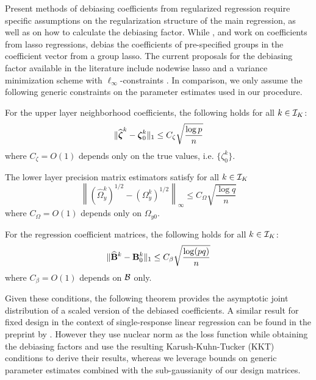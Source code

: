 Present methods of debiasing coefficients from regularized regression require specific assumptions on the regularization structure of the main regression, as well as on how to calculate the debiasing factor. While \cite{ZhangZhang14}, \cite{JavanmardMontanari14} and \cite{vanDeGeerEtal14} work on coefficients from lasso regressions, \cite{MitraZhang16} debias the coefficients of pre-specified groups in the coefficient vector from a group lasso. The current proposals for the debiasing factor available in the literature include nodewise lasso \citep{ZhangZhang14} and a variance minimization scheme with $\ell_\infty$-constraints \citep{JavanmardMontanari14}. In comparison, we only assume the following generic constraints on the parameter estimates used in our procedure.

\vspace{1em}
 For the upper layer neighborhood coefficients, the following holds for all $k \in {\cal{I}}_K$:
%
$$
\| \widehat {{\boldsymbol{\zeta}}}^k - {\boldsymbol{\zeta}}_0^k \|_1 \leq C_\zeta \sqrt { \frac{\log p}{n}}
$$
%
where $C_\zeta = O(1)$ depends only on the true values, i.e. $\{ \zeta^k_0 \}$.

 The lower layer precision matrix estimators satisfy for all $k \in {\cal{I}}_K$
%
$$
\left\| (\widehat \Omega_y^k)^{1/2} - (\Omega_y^k)^{1/2} \right\|_\infty \leq C_\Omega \sqrt { \frac{\log q}{n}}
$$
%
where $C_\Omega = O(1)$ depends only on $\Omega_{y 0}$.

 For the regression coefficient matrices, the following holds for all $k \in {\cal{I}}_K$:
%
$$
\| \widehat {{\mathbf{B}}}^k - {\mathbf{B}}^k_0 \|_1 \leq C_\beta \sqrt { \frac{\log (p q)}{n}}
$$
%
where $C_\beta = O(1)$ depends on ${\cal{B}}$ only.
\vspace{1em}

Given these conditions, the following theorem provides the asymptotic joint distribution of a scaled version of the debiased coefficients. A similar result for fixed design in the context of single-response linear regression can be found in the preprint by \cite{StuckyVandeGeer17}. However they use nuclear norm as the loss function while obtaining the debiasing factors and use the resulting Karush-Kuhn-Tucker (KKT) conditions to derive their results, whereas we leverage bounds on generic parameter estimates combined with the sub-gaussianity of our design matrices.

